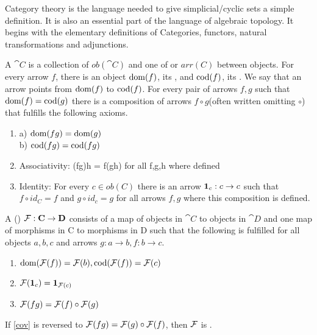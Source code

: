 \documentclass[../../main.tex]{subfiles}
\begin{document}
    Category theory is the language needed to give simplicial/cyclic sets a simple definition. It is also an essential part of the language of algebraic topology. It begins with the elementary definitions of Categories, functors, natural transformations and adjunctions.
        
    \begin{definition}
        A  $\cat{C}$ is a collection of  $ob(\cat{C})$ and one of  or  $arr(C)$ between objects. For every arrow $f$, there is an object $\domain{f}$, its , and $\codomain{f}$, its . We say that an arrow points from $\domain{f}$ to $\codomain{f}$. For every pair of arrows $f, g$ such that $\domain{f} = \codomain{g}$ there is a composition of arrows $f \circ g$(often written omitting $\circ$) that fulfills the following axioms.
        
        \begin{enumerate}
            \item a) $\domain{fg} = \domain{g}$ \\
                b) $\codomain{fg} = \codomain{fg}$
            \item Associativity: (fg)h = f(gh) for all f,g,h where defined
            \item Identity: For every $c \in ob(C)$ there is an arrow $\idarrow[c]: c \to c$ such that $f \circ id_C = f$ and $g \circ id_c = g$ for all arrows $f, g$ where this composition is defined.
        \end{enumerate}
    \end{definition}
    
    \begin{definition}
        A ()  $\functor{F}: \cat{C} \to \cat{D}$ consists of a map of objects in $\cat{C}$ to objects in $\cat{D}$ and one map of morphisms in C to morphisms in D such that the following is fulfilled for all objects $a, b, c$ and arrows $g: a \to b, f: b \to c$.
        
        \begin{enumerate}
            \item $\domain{\functor{F}(f)} = \functor{F}(b), \codomain{\functor{F}(f)} = \functor{F}(c)$
            \item $\functor{F}(\idarrow[c]) = \idarrow[\functor{F}(c)]$
            \item $\functor{F}(fg) = \functor{F}(f) \circ \functor{F}(g)$ \label{cov}
        \end{enumerate}
        
        If \ref{cov} is reversed to $\functor{F}(fg) = \functor{F}(g) \circ \functor{F}(f)$, then $\functor{F}$ is .
    \end{definition}
    
\end{document}
